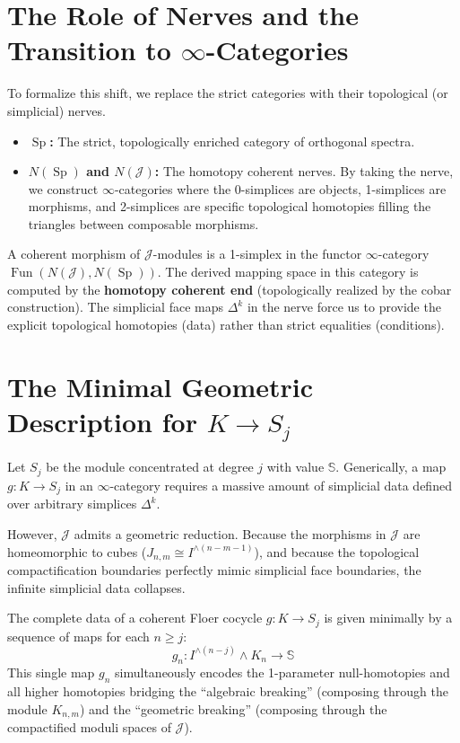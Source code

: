 \documentclass[11pt]{article}
\begin{document}
\section{The Role of Nerves and the Transition to $\infty$-Categories}

To formalize this shift, we replace the strict categories with their topological (or simplicial) nerves.
\begin{itemize}
    \item \textbf{$\operatorname{Sp}$:} The strict, topologically enriched category of orthogonal spectra.
    \item \textbf{$N(\operatorname{Sp})$ and $N(\mathcal{J})$:} The homotopy coherent nerves. By taking the nerve, we construct $\infty$-categories where the 0-simplices are objects, 1-simplices are morphisms, and 2-simplices are specific topological homotopies filling the triangles between composable morphisms.
\end{itemize}

A coherent morphism of $\mathcal{J}$-modules is a 1-simplex in the functor $\infty$-category $\operatorname{Fun}(N(\mathcal{J}), N(\operatorname{Sp}))$. The derived mapping space in this category is computed by the \textbf{homotopy coherent end} (topologically realized by the cobar construction). The simplicial face maps $\Delta^k$ in the nerve force us to provide the explicit topological homotopies (data) rather than strict equalities (conditions).

\section{The Minimal Geometric Description for $K \to S_j$}

Let $S_j$ be the module concentrated at degree $j$ with value $\mathbb{S}$. Generically, a map $g: K \to S_j$ in an $\infty$-category requires a massive amount of simplicial data defined over arbitrary simplices $\Delta^k$. 

However, $\mathcal{J}$ admits a geometric reduction. Because the morphisms in $\mathcal{J}$ are homeomorphic to cubes ($J_{n,m} \cong I^{\wedge(n-m-1)}$), and because the topological compactification boundaries perfectly mimic simplicial face boundaries, the infinite simplicial data collapses.

The complete data of a coherent Floer cocycle $g: K \to S_j$ is given minimally by a sequence of maps for each $n \geq j$:
\[ g_n: I^{\wedge (n-j)} \wedge K_n \to \mathbb{S} \]
This single map $g_n$ simultaneously encodes the 1-parameter null-homotopies and all higher homotopies bridging the ``algebraic breaking'' (composing through the module $K_{n,m}$) and the ``geometric breaking'' (composing through the compactified moduli spaces of $\mathcal{J}$).
\end{document}
